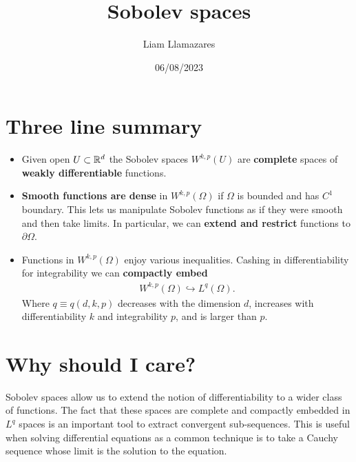 \documentclass[12pt]{article}
\theoremstyle{remark}
\begin{document}
\title{Sobolev spaces}
\author{Liam Llamazares}
\date{06/08/2023}
\maketitle
\section{ Three line summary}
\begin{itemize}
	\item Given open $U \subset \mathbb{R}^d$ the Sobolev spaces $W^{k,p}(U)$ are \textbf{complete} spaces of \textbf{ weakly differentiable} functions.
	\item \textbf{Smooth functions are dense} in  $W^{k,p}(\Omega)$ if $\Omega$  is bounded and has $C^1$ boundary. This lets us manipulate Sobolev functions as if they were smooth and then take limits. In particular, we can \textbf{extend and restrict} functions to $\partial \Omega$.
	\item Functions in $W^{k,p}(\Omega)$ enjoy various inequalities. Cashing in differentiability for integrability we can \textbf{compactly embed}
	      \begin{align*}
		      W^{k,p}(\Omega) \hookrightarrow L^q(\Omega).
	      \end{align*}
	      Where $q\equiv q(d,k,p)$ decreases with the dimension $d$, increases with differentiability $k$ and integrability $p$, and is larger than $p$.
\end{itemize}
\section{Why should I care?}
Sobolev spaces allow us to extend the notion of differentiability to a wider class of functions. The fact that these spaces are complete and compactly embedded in $L^q$ spaces is an important tool to extract convergent sub-sequences. This is useful when solving differential equations as a common technique is to take a Cauchy sequence whose limit is the solution to the equation.
\end{document}
